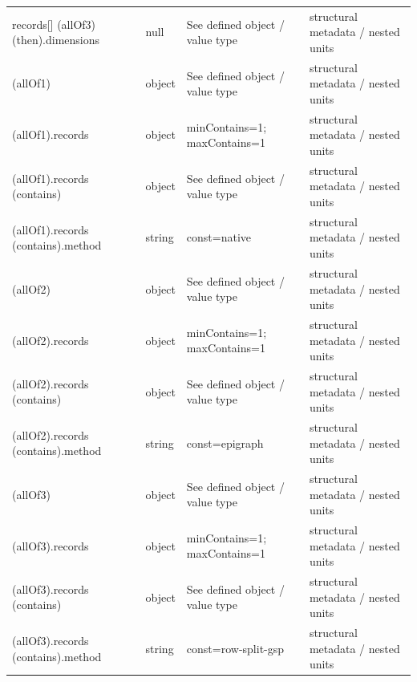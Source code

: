 \begin{longtable}{@{}>{\raggedright\arraybackslash}p{}>{\raggedright\arraybackslash}p{}>{\raggedright\arraybackslash}p{}>{\raggedright\arraybackslash}p{}@{}}
records[] (allOf3) (then).\allowbreak{}dimensions & null & See defined object /\allowbreak{} value type & structural metadata /\allowbreak{} nested units\\
 (allOf1) & object & See defined object /\allowbreak{} value type & structural metadata /\allowbreak{} nested units\\
 (allOf1).\allowbreak{}records & object & minContains=\allowbreak{}1; maxContains=\allowbreak{}1 & structural metadata /\allowbreak{} nested units\\
 (allOf1).\allowbreak{}records (contains) & object & See defined object /\allowbreak{} value type & structural metadata /\allowbreak{} nested units\\
 (allOf1).\allowbreak{}records (contains).\allowbreak{}method & string & const=\allowbreak{}native & structural metadata /\allowbreak{} nested units\\
 (allOf2) & object & See defined object /\allowbreak{} value type & structural metadata /\allowbreak{} nested units\\
 (allOf2).\allowbreak{}records & object & minContains=\allowbreak{}1; maxContains=\allowbreak{}1 & structural metadata /\allowbreak{} nested units\\
 (allOf2).\allowbreak{}records (contains) & object & See defined object /\allowbreak{} value type & structural metadata /\allowbreak{} nested units\\
 (allOf2).\allowbreak{}records (contains).\allowbreak{}method & string & const=\allowbreak{}epigraph & structural metadata /\allowbreak{} nested units\\
 (allOf3) & object & See defined object /\allowbreak{} value type & structural metadata /\allowbreak{} nested units\\
 (allOf3).\allowbreak{}records & object & minContains=\allowbreak{}1; maxContains=\allowbreak{}1 & structural metadata /\allowbreak{} nested units\\
 (allOf3).\allowbreak{}records (contains) & object & See defined object /\allowbreak{} value type & structural metadata /\allowbreak{} nested units\\
 (allOf3).\allowbreak{}records (contains).\allowbreak{}method & string & const=\allowbreak{}row-\allowbreak{}split-\allowbreak{}gsp & structural metadata /\allowbreak{} nested units\\
\end{longtable}\endgroup
